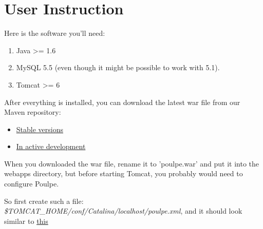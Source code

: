 \documentclass[11pt,a4paper,oneside]{article}
\begin{document}
\section{User Instruction}
Here is the software you'll need:
\begin{enumerate}
 \item Java \textgreater= 1.6
 \item MySQL 5.5 (even though it might be possible to work with 5.1). 
 \item Tomcat \textgreater= 6
\end{enumerate}
After everything is installed, you can download the latest war file from our Maven repository:
\begin{itemize}
 \item \href{http://repo.jtalks.org/content/repositories/releases/org/jtalks/poulpe/poulpe-web-view}{Stable versions}
 \item \href{http://repo.jtalks.org/content/repositories/deployment-pipeline/deployment-pipeline/poulpe}{In active development}
\end{itemize}
When you downloaded the war file, rename it to 'poulpe.war' and put it into the webapps directory, but before starting Tomcat, you probably would need to configure Poulpe. 

So first create such a file: \emph{\$TOMCAT\_HOME/conf/Catalina/localhost/poulpe.xml}, and it should look similar to \href{run:./poulpe.xml}{this}
\end{document}
